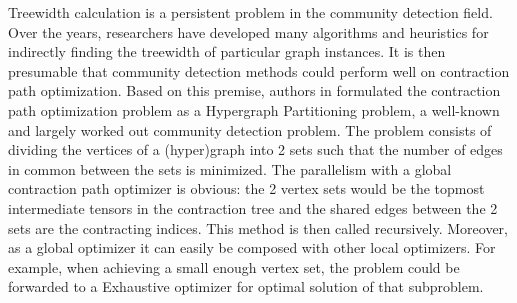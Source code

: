\documentclass{juliacon}
\begin{document}
Treewidth calculation is a persistent problem in the community detection field.
Over the years, researchers have developed many algorithms and heuristics for indirectly finding the treewidth of particular graph instances.
It is then presumable that community detection methods could perform well on contraction path optimization.
Based on this premise, authors in \cite{gray2021hyper} formulated the contraction path optimization problem as a Hypergraph Partitioning problem, a well-known and largely worked out community detection problem.
The problem consists of dividing the vertices of a (hyper)graph into 2 sets such that the number of edges in common between the sets is minimized.
The parallelism with a global contraction path optimizer is obvious: the 2 vertex sets would be the topmost intermediate tensors in the contraction tree and the shared edges between the 2 sets are the contracting indices.
This method is then called recursively. Moreover, as a global optimizer it can easily be composed with other local optimizers.
For example, when achieving a small enough vertex set, the problem could be forwarded to a Exhaustive optimizer for optimal solution of that subproblem. 

\end{document}
